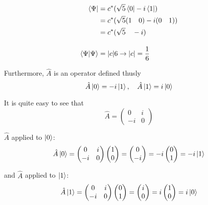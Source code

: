 \documentclass{article}
\begin{document}
\begin{align*}
\bra{\Psi} 	&= c^*(\sqrt{5}\bra{0}-i\bra{1}) \\
			&= c^*( \sqrt{5} ( 1 \quad 0 ) -i ( 0 \quad 1 )) \\
			&= c^* ( \sqrt{5} \quad  -i ) \\[10pt]
\braket{\Psi} &= \abs{c}6 \rightarrow \abs{c}=\frac{1}{6}
\end{align*}

Furthermore, $\hat{A}$ is an operator defined thusly
\begin{equation*}
\hat{A}\ket{0} = -i\ket{1}, \quad \hat{A}\ket{1} = i\ket{0}
\end{equation*}


It is quite easy to see that 
\begin{equation*}
\hat{A} = \begin{pmatrix} 0 & i \\ -i & 0 \end{pmatrix}
\end{equation*}

$\hat{A}$ applied to $\ket{0}$:
\begin{equation*}
\hat{A}\ket{0} =
\begin{pmatrix} 0 & i \\ -i & 0 \end{pmatrix} \begin{pmatrix} 1 \\ 0 \end{pmatrix} = \begin{pmatrix} 0 \\ -i \end{pmatrix} = -i \begin{pmatrix} 0 \\ 1 \end{pmatrix} = -i\ket{1}
\end{equation*}


and $\hat{A}$ applied to $\ket{1}$:
\begin{equation*}
\hat{A}\ket{1} =
\begin{pmatrix} 0 & i \\ -i & 0 \end{pmatrix} \begin{pmatrix} 0 \\ 1 \end{pmatrix} = \begin{pmatrix} i \\ 0 \end{pmatrix} = i \begin{pmatrix} 1 \\ 0 \end{pmatrix} = i\ket{0}
\end{equation*}
\end{document}
